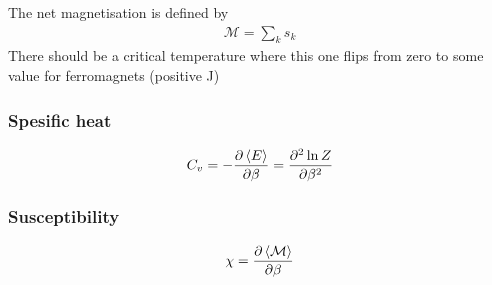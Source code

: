 \documentclass[11pt,a4paper,english]{article}
\numberwithin{equation}{section}
\newcommand{\magM}{\mathcal{M}}
\begin{document}
The net magnetisation is defined by
\begin{gather}
\magM = \sum_k s_k
\end{gather}
There should be a critical temperature where this one flips from 
zero to some value for ferromagnets (positive J)

\subsubsection{Spesific heat}
\begin{gather}
C_v = -\frac{\partial \expval{E}}{\partial \beta}
 = \frac{\partial^2 \ln Z}{\partial \beta^2}
\end{gather}

\subsubsection{Susceptibility}
\begin{gather}
\chi = \frac{\partial\expval{\magM}}{\partial \beta}
\end{gather}
\end{document}
